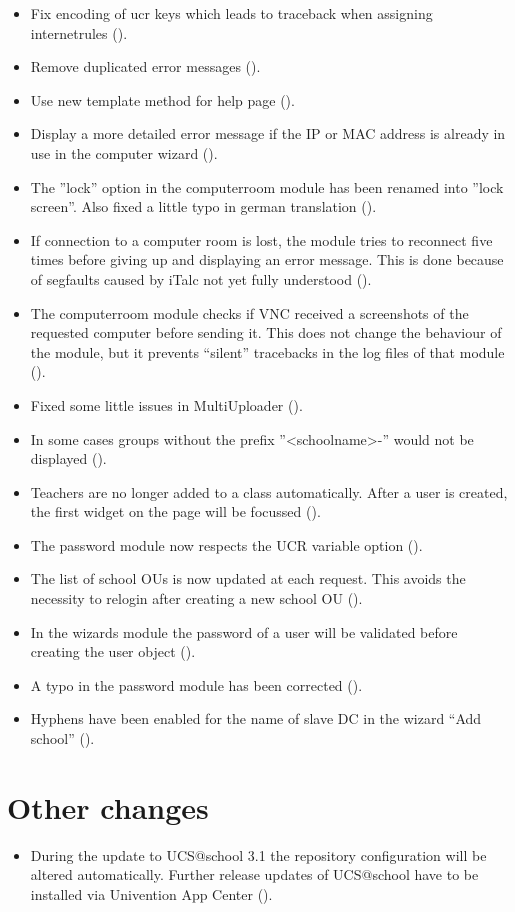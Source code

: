 \begin{itemize}
\item Fix encoding of ucr keys which leads to traceback when assigning internetrules ().
\item Remove duplicated error messages ().
\item Use new template method for help page ().
\item Display a more detailed error message if the IP or MAC address is
  already in use in the computer wizard ().
\item The ''lock'' option in the computerroom module has been renamed into ''lock screen''. Also fixed a little typo in german translation ().
\item If connection to a computer room is lost, the module tries to reconnect
  five times before giving up and displaying an error message. This is done
  because of segfaults caused by iTalc not yet fully understood
  ().
\item The computerroom module checks if VNC received a screenshots of the
  requested computer before sending it. This does not change the behaviour of
  the module, but it prevents ``silent'' tracebacks in the log files of that
  module ().
\item Fixed some little issues in MultiUploader ().
\item In some cases groups without the prefix ''<schoolname>-'' would not be
  displayed ().
\item Teachers are no longer added to a class automatically. After a user is
  created, the first widget on the page will be focussed ().
\item The password module now respects the
  UCR variable  option ().
\item The list of school OUs is now updated at each request. This avoids the
  necessity to relogin after creating a new school OU ().

\item In the wizards module the password of a user will be validated before
  creating the user object ().

\item A typo in the password module has been corrected ().

\item Hyphens have been enabled for the name of slave DC in the wizard
  ``Add school'' ().

\end{itemize}

\section{Other changes}
\begin{itemize}
\item During the update to UCS@school 3.1 the repository configuration will be altered automatically.
  Further release updates of UCS@school have to be installed via Univention App Center ().
\end{itemize}
